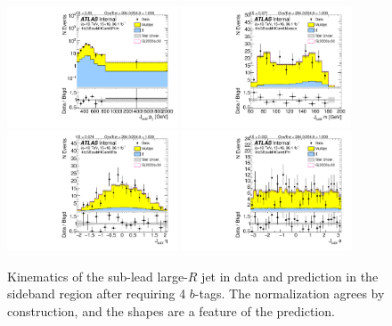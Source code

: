 \begin{figure}[htbp!]
\begin{center}
\includegraphics[width=0.45\textwidth,angle=-90]{figures/boosted/Sideband/b77_FourTag_Sideband_sublHCand_Pt_m_1.pdf}
\includegraphics[width=0.45\textwidth,angle=-90]{figures/boosted/Sideband/b77_FourTag_Sideband_sublHCand_Mass_s.pdf}\\
\includegraphics[width=0.45\textwidth,angle=-90]{figures/boosted/Sideband/b77_FourTag_Sideband_sublHCand_Eta.pdf}
\includegraphics[width=0.45\textwidth,angle=-90]{figures/boosted/Sideband/b77_FourTag_Sideband_sublHCand_Phi.pdf}
  \caption{Kinematics of the sub-lead large-$R$ jet in data and prediction in the sideband region after requiring 4 $b$-tags. The normalization agrees by construction, and the shapes are a feature of the prediction.}
  \label{fig:boosted-4b-sideband-ak10-subl}
\end{center}
\end{figure}

